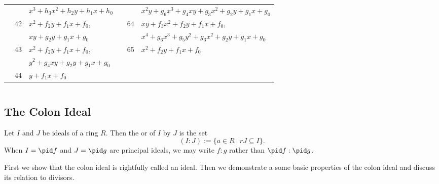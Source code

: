 \begin{center}
\begin{tabular}{l|l|l||l|l|l}
    & & $x^3 + h_3x^2 + h_2y + h_1x + h_0$ & & & $x^2y + g_6x^3 + g_4xy + g_3x^2 + g_2y + g_1x + g_0$ \\
    \cline{2-3}\cline{5-6}
    &\multirow{2}{*}{42} & $x^2 + f_2y + f_1x + f_0$, & &\multirow{2}{*}{64} & $xy + f_3x^2 + f_2y + f_1x + f_0$, \\
    & & $xy + g_2y + g_1x + g_0$ & & & $x^4 + g_6x^3 + g_5y^2 + g_3x^2 + g_2y + g_1x + g_0$ \\
    \cline{2-3}\cline{5-6}
    &\multirow{2}{*}{43} & $x^2 + f_2y + f_1x + f_0$, & &\multirow{1}{*}{65} & $x^2 + f_2y + f_1x + f_0$ \\
    \cline{4-6}
    & & $y^2 + g_4xy + g_2y + g_1x + g_0$ \\
    \cline{2-3}
    &\multirow{1}{*}{44}
      & $y + f_1x + f_0$
\end{tabular}
\begin{tabular}{l|l|l}
    
\end{tabular}
\end{center}
\subsection{The Colon Ideal}

\begin{definition}
  Let $I$ and $J$ be ideals of a ring $R$.
  Then the  or  of $I$ by $J$ is the set
  \[ (I:J) := \{ a \in R ~|~ rJ \subseteq I \}. \]
  When $I = \pid f$ and $J = \pid g$ are principal ideals, we may write $f : g$ rather than $\pid f : \pid g$.
\end{definition}

First we show that the colon ideal is rightfully called an ideal.
Then we demonstrate a some basic properties of the colon ideal and discuss its relation to divisors.

